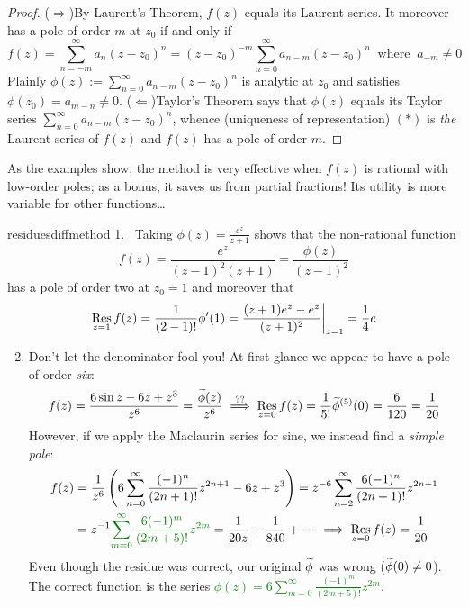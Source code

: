 \begin{proof}
($\Rightarrow$)\quad By Laurent's Theorem, $f(z)$ equals its Laurent series. It moreover has a pole of order $m$ at $z_0$ if and only if
\[f(z)=\sum_{n=-m}^\infty a_n(z-z_0)^n =(z-z_0)^{-m}\sum_{n=0}^\infty a_{n-m}(z-z_0)^n\ \text{ where }\ a_{-m}\neq 0\tag{$\ast$}\]
Plainly $\phi(z):=\sum\limits_{n=0}^\infty a_{n-m}(z-z_0)^n$ is analytic at $z_0$ and satisfies $\phi(z_0)=a_{m-n}\neq 0$.\smallbreak
($\Leftarrow$)\quad Taylor's Theorem says that $\phi(z)$ equals its Taylor series $\sum\limits_{n=0}^\infty a_{n-m}(z-z_0)^n$, whence (uniqueness of representation) $(\ast)$ is \emph{the} Laurent series of $f(z)$ and $f(z)$ has a pole of order $m$.
\end{proof}

As the examples show, the method is very effective when $f(z)$ is rational with low-order poles; as a bonus, it saves us from partial fractions! Its utility is more variable for other functions\ldots

\begin{examples}{}{residuesdiffmethod}
\hangindent\leftmargini
\textup{1.} \ Taking $\phi(z)=\frac{e^z}{z+1}$ shows that the non-rational function
\[f(z)=\frac{e^z}{(z-1)^2(z+1)}=\frac{\phi(z)}{(z-1)^2}\]
has a pole of order two at $z_0=1$ and moreover that
\[\operatorname*{Res}_{z=1}f(z)=\frac 1{(2-1)!}\phi'(1)=\frac{(z+1)e^z-e^z}{(z+1)^2}\bigg|_{z=1} =\frac 14e\]
\begin{enumerate}\setcounter{enumi}{1}
  \item\label{ex:residuesdiffmethod2} Don't let the denominator fool you! At first glance we appear to have a pole of order \emph{six}: 
	\[f(z)=\frac{6\sin z-6z+z^3}{z^6}=\frac{\smash[t]{\widetilde\phi(z)}}{z^6}\overset{\text{??}}{\implies} \operatorname*{Res}_{z=0}f(z)=\frac 1{5!}\widetilde\phi^{(5)}(0)=\frac 6{120}=\frac 1{20}\]
	However, if we apply the Maclaurin series for sine, we instead find a \emph{simple pole}:
	\begin{align*}
  f(z)&=\frac 1{z^6}\left(6\sum_{n=0}^\infty\frac{(-1)^n}{(2n+1)!}z^{2n+1}-6z+z^3\right)=z^{-6}\sum_{n=2}^\infty\frac{6(-1)^n}{(2n+1)!}z^{2n+1}\\
  &=z^{-1}\textcolor{Green}{\sum_{m=0}^\infty\frac{6(-1)^m}{(2m+5)!}z^{2m}}=\frac 1{20z}+\frac 1{840}+\cdots\implies \Resl{z=0}f(z)=\frac 1{20}
  \end{align*}
  Even though the residue was correct, our original $\smash[t]{\widetilde\phi}$ was wrong ($\smash[t]{\widetilde\phi}(0)\neq 0$). The correct function is the series \textcolor{Green}{$\phi(z)=6\sum\limits_{m=0}^\infty\frac{(-1)^m}{(2m+5)!}z^{2m}$}.
\end{enumerate}
\end{examples}


